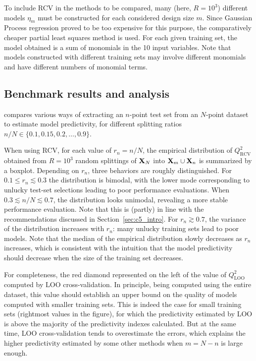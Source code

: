 To include RCV in the methods to be compared, many (here, $R=10^3$) different models $\eta_m$ must be constructed for each considered design size $m$. 
Since Gaussian Process regression proved to be too expensive for this purpose, the comparatively cheaper partial least squares method \citep{wolsjo01} is used. 
For each given training set, the model obtained is a sum of monomials in the 10 input variables. 
Note that models constructed with different training sets may involve different monomials and have different numbers of monomial terms. 


\subsection{Benchmark results and analysis}

 compares various ways of extracting an $n$-point test set from an $N$-point dataset to estimate model predictivity, for different splitting ratios $n/N\in\{0.1,0.15,0.2,\ldots,0.9\}$. 

When using RCV, for each value of $r_n=n/N$, the empirical distribution of $Q^2_{\mathrm{RCV}}$ obtained from $R=10^3$ random splittings of ${\bf X}_N$ into ${\bf X}_m\cup{\bf X}_n$ is summarized by a boxplot. 
Depending on $r_n$, three behaviors are roughly distinguished. 
For $0.1 \leq r_n \lesssim 0.3$ the distribution is bimodal, with the lower mode corresponding to unlucky test-set selections leading to poor performance evaluations. 
When $0.3 \lesssim n/N \lesssim 0.7$, the distribution looks unimodal, revealing a more stable performance evaluation. 
Note that this is (partly) in line with the recommendations discussed in Section~\ref{sec:c5_intro}. 
For $r_n \gtrsim 0.7$, the variance of the distribution increases with $r_n$: many unlucky training sets lead to poor models. 
Note that the median of the empirical distribution slowly decreases as $r_n$ increases, which is consistent with the intuition that the model predictivity should decrease when the size of the training set decreases. 

For completeness, the red diamond represented on the left of  the value of $Q^2_{\mathrm{LOO}}$ computed by LOO cross-validation. 
In principle, being computed using the entire dataset, this value should establish an upper bound on the quality of models computed with smaller training sets. 
This is indeed the case for small training sets (rightmost values in the figure), for which the predictivity estimated by LOO is above the majority of the predictivity indexes calculated. 
But at the same time, LOO cross-validation tends to overestimate the errors, which explains the higher predictivity estimated by some other methods when $m=N-n$ is large enough.

